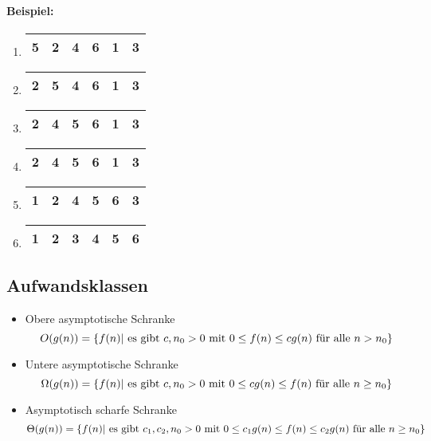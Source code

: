\documentclass[a4paper,twoside,DIV15,BCOR12mm]{scrbook}
\begin{document}
\paragraph{Beispiel:}\hspace{0.1mm}

\begin{enumerate}\renewcommand\labelenumi{(\alph{enumi})}
\item
\begin{tabular}{|r|r|r|r|r|r|}
\hline
5 & \textbf{2} & 4 & 6 & 1 & 3 \\
\hline
\end{tabular} 
\item
\begin{tabular}{|r|r|r|r|r|r|}
\hline
2 & 5 & \textbf{4} & 6 & 1 & 3 \\
\hline
\end{tabular} 
\item
\begin{tabular}{|r|r|r|r|r|r|}
\hline
2 & 4 & 5 & \textbf{6} & 1 & 3 \\
\hline
\end{tabular} 
\item
\begin{tabular}{|r|r|r|r|r|r|}
\hline
2 & 4 & 5 & 6 & \textbf{1} & 3 \\
\hline
\end{tabular} 
\item
\begin{tabular}{|r|r|r|r|r|r|}
\hline
1 & 2 & 4 & 5 & 6 & \textbf{3} \\
\hline
\end{tabular} 
\item
\begin{tabular}{|r|r|r|r|r|r|}
\hline
1 & 2 & 3 & 4 & 5 & 6 \\
\hline
\end{tabular}
\end{enumerate}


\subsection {Aufwandsklassen}
\begin{itemize}
\item Obere asymptotische Schranke
$$ O(g(n))=\{f(n)| \textnormal{ es gibt } c,n_0>0 \textnormal{ mit } 0 \leq f(n) \leq cg(n) \textnormal{ für alle } n>n_0 \} $$
\item Untere asymptotische Schranke
$$ \Omega(g(n))=\{f(n)| \textnormal{ es gibt } c,n_0>0 \textnormal{ mit } 0 \leq cg(n)\leq f(n) \textnormal{ für alle } n \geq n_0 \} $$
\item Asymptotisch scharfe Schranke
$$ \Theta(g(n))=\{f(n)| \textnormal{ es gibt } c_1,c_2,n_0>0 \textnormal{ mit } 0\leq c_1 g(n) \leq f(n) \leq c_2 g(n) \textnormal{ für alle } n \geq n_0\} $$ 
\end{itemize}
\end{document}
